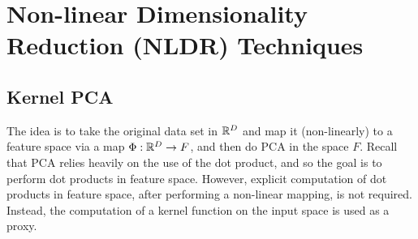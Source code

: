 \documentclass{gtpart}
\theoremstyle{definition}
\begin{document}
\section{Non-linear Dimensionality Reduction (NLDR) Techniques}

\subsection{Kernel PCA}

The idea is to take the original data set in $\mathbb{R}^D$ and map it (non-linearly) to a feature space via a map $\Phi : \mathbb{R}^D \rightarrow F$, and then do PCA in the space $F$. Recall that PCA relies heavily on the use of the dot product, and so the goal is to perform dot products in feature space. However, explicit computation of dot products in feature space, after performing a non-linear mapping, is not required. Instead, the computation of a kernel function on the input space is used as a proxy.
\end{document}
